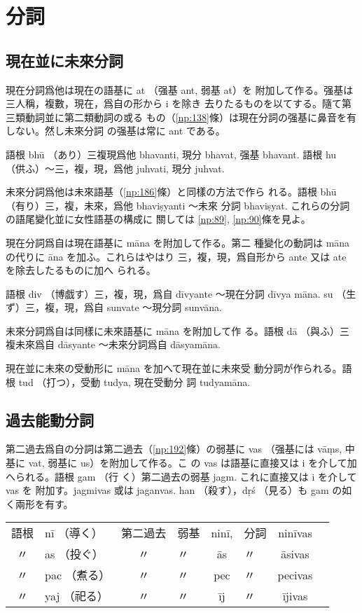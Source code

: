 \section{分詞}
\subsection{現在並に未來分詞}
\numberParagraph
現在分詞爲他は現在の語基に at （强基 ant, 弱基 at）を
附加して作る。强基は三人稱，複數，現在，爲自の形から i を除き
去りたるものを以てする。隨て第三類動詞並に第二類動詞の或る
もの（\ref{np:138}條）は現在分詞の强基に鼻音を有しない。然し未來分詞
の强基は常に ant である。

語根 bhū （あり）三複現爲他 bhavanti, 現分 bhavat, 强基
bhavant. 語根 hu （供ふ）～三，複，現，爲他 juhvati, 現分
juhvat.

\numberParagraph
未來分詞爲他は未來語基（\ref{np:186}條）と同樣の方法で作ら
れる。語根 bhū （有り）三，複，未來，爲他 bhaviṣyanti ～未來
分詞 bhaviṣyat. これらの分詞の語尾變化並に女性語基の構成に
關しては \ref{np:89}, \ref{np:90}條を見よ。

\numberParagraph \label{np:174}
現在分詞爲自は現在語基に māna を附加して作る。第二
種變化の動詞は māna の代りに āna を加ふ。これらはやはり
三，複，現，爲自形から ante 又は ate を除去したるものに加へ
られる。

語根 div （博戯す）三，複，現，爲自 dīvyante ～現在分詞 dīvya\-%
māna. su （生ず）三，複，現，爲自 sunvate ～現分詞 sunvāna.

\numberParagraph
未來分詞爲自は同樣に未來語基に māna を附加して作
る。語根 dā （與ふ）三複未來爲自 dāsyante ～未來分詞爲自
dāsyamāna.

\numberParagraph \label{np:176}
現在並に未來の受動形に māna を加へて現在並に未來受
動分詞が作られる。語根 tud （打つ），受動 tudya, 現在受動分
詞 tudyamāna.

\subsection{過去能動分詞}
\numberParagraph \label{np:177}
第二過去爲自の分詞は第二過去（\ref{np:192}條）の弱基に vas
（强基には vāṃs, 中基に vat, 弱基に us）を附加して作る。こ
の vas は語基に直接又は i を介して加へられる。語根 gam （行
く）第二過去の弱基 jagm. これに直接又は i を介して vas を
附加す。jagmivas 或は jaganvas. han （殺す），dṛś （見る）も
gam の如く兩形を有す。

\begin{center}
\begin{tabular}{clclclcl}
  語根 & nī （導く）  & 第二過去 & 弱基 & ninī, & 分詞 & ninīvas \\
  〃   & as （投ぐ）  & 〃       & 〃   & ās    & 〃   & āsivas \\
  〃   & pac （煮る） & 〃       & 〃   & pec   & 〃   & pecivas \\
  〃   & yaj （祀る） & 〃       & 〃   & īj    & 〃   & ījivas
\end{tabular}
\end{center}

